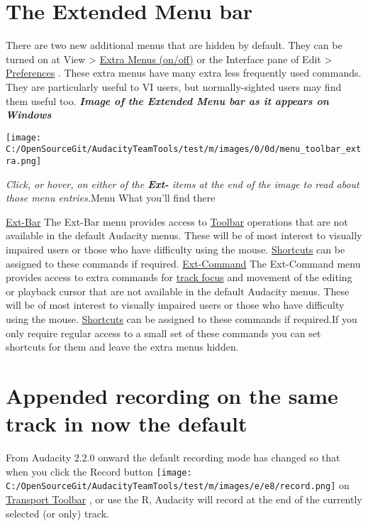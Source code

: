 \begin{multicols}{2}
\section{The Extended Menu bar}There are two new additional menus that are hidden by default.  They can be turned on at View > 
\hyperref[view_menu__extra_menus_onoff]{Extra Menus (on/off)}
 or the Interface pane of Edit > 
\hyperref[interface_preferences_]{Preferences}
.
These extra menus have many extra less frequently used commands.  They are particularly useful to VI users, but normally-sighted users may find them useful too.
\textit{\textbf{Image of the Extended Menu bar as it appears on Windows}}\par \texttt{[image: C:/OpenSourceGit/AudacityTeamTools/test/m/images/0/0d/menu\_toolbar\_extra.png]}\par \textit{Click, or hover, on either of the \textbf{Ext-} items at the end of the image to read about those menu entries.}Menu
What you'll find there

\hyperref[ext_bar_menu_]{Ext-Bar}
The Ext-Bar menu provides access to 
\hyperref[toolbars_overview_]{Toolbar}
 operations that are not available in the default Audacity menus. These will be of most interest to visually impaired users or those who have difficulty using the mouse.
\hyperref[keyboard_preferences_]{Shortcuts}
 can be assigned to these commands if required.
\hyperref[ext_command_menu_]{Ext-Command}
The Ext-Command menu provides access to extra commands for 
\hyperref[audio_tracks__focus]{track focus}
 and movement of the editing or playback cursor that are not available in the default Audacity menus. These will be of most interest to visually impaired users or those who have difficulty using the mouse.
\hyperref[keyboard_preferences_]{Shortcuts}
 can be assigned to these commands if required.If you only require regular access to a small set of these commands you can set shortcuts for them and leave the extra menus hidden.
\section{Appended recording on the same track in now the default}From Audacity 2.2.0 onward the default recording mode has changed so that when you click the Record button \texttt{[image: C:/OpenSourceGit/AudacityTeamTools/test/m/images/e/e8/record.png]} on 
\hyperref[transport_toolbar_]{Transport Toolbar}
, or use the R, Audacity will record at the end of the currently selected (or only) track.


\end{multicols}
